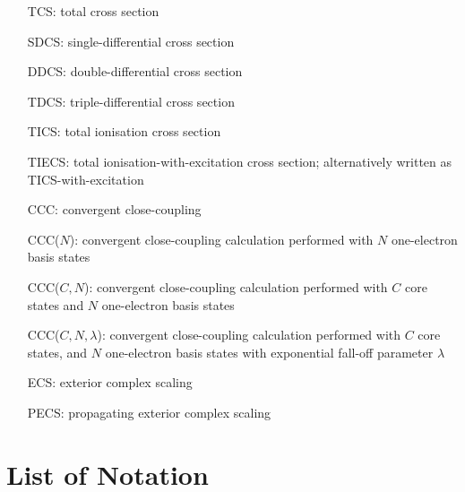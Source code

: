 \documentclass[]{article}
\begin{document}
\begin{itemize}
\item[TCS:]
  total cross section
\item[SDCS:]
  single-differential cross section
\item[DDCS:]
  double-differential cross section
\item[TDCS:]
  triple-differential cross section
\item[TICS:]
  total ionisation cross section
\item[TIECS:]
  total ionisation-with-excitation cross section; alternatively written as
  TICS-with-excitation
\item[CCC:]
  convergent close-coupling
\item[CCC($N$):]
  convergent close-coupling calculation performed with $N$ one-electron basis
  states
\item[CCC($C, N$):]
  convergent close-coupling calculation performed with $C$ core states and $N$
  one-electron basis states
\item[CCC($C, N, \lambda$):]
  convergent close-coupling calculation performed with $C$ core states, and $N$
  one-electron basis states with exponential fall-off parameter $\lambda$
\item[ECS:]
  exterior complex scaling
\item[PECS:]
  propagating exterior complex scaling
\end{itemize}

\clearpage

\section*{List of Notation}
\end{document}
